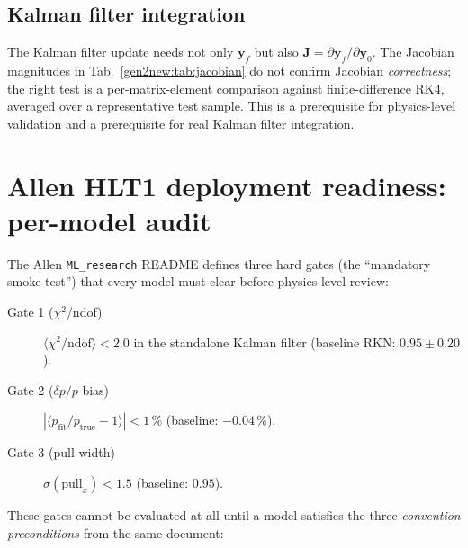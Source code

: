 \documentclass[a4paper,11pt]{article}
\newcommand{\state}{\mathbf{y}}
\newcommand{\Jac}{\mathbf{J}}
\begin{document}
\subsection{Kalman filter integration}

The Kalman filter update \cite{Fruhwirth1987,LHCb2008} needs not only
$\state_f$ but also $\Jac=\partial\state_f/\partial\state_0$. The
Jacobian magnitudes in Tab.~\ref{gen2new:tab:jacobian} do not confirm
Jacobian \emph{correctness}; the right test is a per-matrix-element
comparison against finite-difference RK4, averaged over a
representative test sample. This is a prerequisite for physics-level
validation and a prerequisite for real Kalman filter integration.

\section{Allen HLT1 deployment readiness: per-model
audit}\label{gen2new:sec:allen}

The Allen \texttt{ML\_research} README defines three hard gates
(the ``mandatory smoke test'') that every model must clear before
physics-level review:
\begin{description}
  \item[Gate 1 ($\chi^2$/ndof)] $\langle\chi^2/\text{ndof}\rangle < 2.0$
        in the standalone Kalman filter (baseline RKN: $0.95\pm0.20$).
  \item[Gate 2 ($\delta p/p$ bias)] $|\langle p_\text{fit}/p_\text{true}
        -1\rangle| < 1\,\%$ (baseline: $-0.04\,\%$).
  \item[Gate 3 (pull width)] $\sigma(\text{pull}_x) < 1.5$
        (baseline: $0.95$).
\end{description}
These gates cannot be evaluated at all until a model satisfies the
three \emph{convention preconditions} from the same document:
\end{document}
